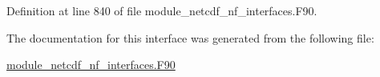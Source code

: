Definition at line 840 of file module\+\_\+netcdf\+\_\+nf\+\_\+interfaces.\+F90.



The documentation for this interface was generated from the following file\+:\begin{DoxyCompactItemize}
\item 
\hyperlink{module__netcdf__nf__interfaces_8F90}{module\+\_\+netcdf\+\_\+nf\+\_\+interfaces.\+F90}\end{DoxyCompactItemize}
